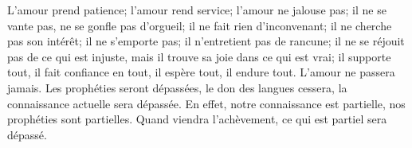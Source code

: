 L’amour prend patience; l’amour rend service;
	l’amour ne jalouse pas; il ne se vante pas, ne se gonfle pas d’orgueil;
	il ne fait rien d’inconvenant; il ne cherche pas son intérêt;
	il ne s’emporte pas; il n’entretient pas de rancune;
	il ne se réjouit pas de ce qui est injuste,
	mais il trouve sa joie dans ce qui est vrai;
	il supporte tout, il fait confiance en tout,
	il espère tout, il endure tout.
L’amour ne passera jamais.
	Les prophéties seront dépassées, le don des langues cessera,
	la connaissance actuelle sera dépassée.
En effet, notre connaissance est partielle,
	nos prophéties sont partielles.
	Quand viendra l’achèvement, ce qui est partiel sera dépassé.
